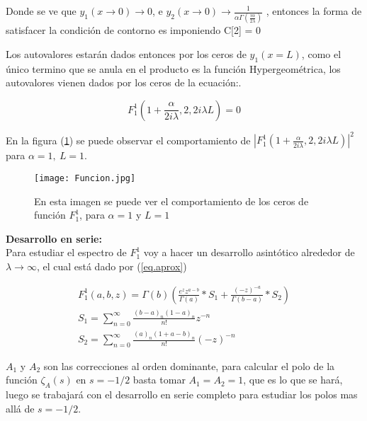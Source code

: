 Donde se ve que $y _1 (x \rightarrow 0 ) \rightarrow 0$, e $y _2 (x \rightarrow 0)  \rightarrow
\frac{1}{  \alpha   \Gamma ( \frac{i \alpha}{2 \lambda}  )   } $ , entonces la forma de satisfacer la condición de contorno es imponiendo C[2] = 0

Los autovalores estarán dados entonces por los ceros de $y_1 (x= L)$, como el único termino que se anula en el producto es la función Hypergeométrica, los autovalores vienen dados por los ceros de la ecuación:.


\begin{equation}
F _1 ^1 (1+\frac{ \alpha}{2 i \lambda},2,2 i \lambda L)  = 0
\label{eq.1}
\end{equation}

En la figura (\ref{fig:funcion}) se puede observar el comportamiento  de $ | F _1 ^1 (1+\frac{ \alpha}{2 i \lambda},2,2 i \lambda L) | ^2 $ para   $\alpha=1, \ L=1$. \\

\begin{figure}[h!]
\centering
\texttt{[image: Funcion.jpg]}
\caption{En esta imagen se puede ver el comportamiento de los ceros de función $F _1 ^1$, para $\alpha=1$ y $L=1$}
\label{fig:funcion}
\end{figure}

\textbf{Desarrollo en serie:} \\

Para estudiar el espectro de $F _1 ^1$ voy a hacer un desarrollo asintótico alrededor de $\lambda \rightarrow \infty$, el cual está dado por (\ref{eq.aprox})


\begin{equation}
\begin{array}{c}
    F _1 ^1 (a,b,z) = \Gamma (b) 
    \left(
    \frac{e^z z ^{a-b} }{\Gamma(a)} * S_1 + \frac{(-z) ^{ -a}}{ \Gamma(b-a)} 
    * S_2
    \right) \\ 
    S _1 = \sum _{n=0} ^{\infty} \frac{(b-a) _n (1-a) _n}{n!} z ^{-n} \\ 
    S _2 = \sum _{n=0} ^{\infty} \frac{(a) _n (1+a-b) _n}{n!} (-z) ^{-n}
    
\end{array}
\label{eq.aprox}
\end{equation}

$A_1$ y $A _2$ son las correcciones al orden dominante, para calcular el polo de la función $\zeta _A (s)$ en $s=-1/2$ basta tomar $A _1 = A _2 = 1$, que es lo que se hará, luego se trabajará con el desarrollo en serie completo para estudiar los polos mas allá de $s=-1/2$. 



